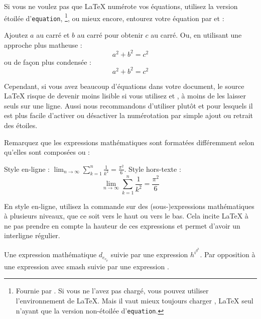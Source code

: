 Si vous ne voulez pas que \LaTeX{} numérote vos équations, utilisez la
version étoilée d'\texttt{equation}, \footnote{Fournie par
  . Si vous ne l'avez pas chargé, vous pouvez utiliser
  l'environnement  de \LaTeX{}. Mais il vaut mieux toujours
  charger , \LaTeX{} seul n'ayant que la version
  non-étoilée d'\texttt{equation}.}, ou mieux encore,
entourez votre équation par \ci{[} et \ci{]} :
\begin{example}
Ajoutez $a$ au carré 
et $b$ au carré pour obtenir
$c$ au carré. Ou, en 
utilisant une approche plus
matheuse :
\begin{equation*}
  a^2 + b^2 = c^2
\end{equation*}
ou de façon plus condensée :
\[ a^2 + b^2 = c^2 \]
\end{example}

Cependant, si vous avez beaucoup d'équations dans votre document, le source
\LaTeX{} risque de devenir moins lisible si vous utilisez \ci{[\iffalse]\fi}
et \ci{\iffalse[\fi]}, à moins de les laisser seuls sur une
ligne. Aussi nous recommandons d'utiliser plutôt  et
 pour lesquels il est plus facile d'activer ou
désactiver la numérotation par simple ajout ou retrait des étoiles.

Remarquez que les expressions mathématiques sont formatées
différemment selon qu'elles sont composées \og {} \fg{} ou \og
{} \fg{} :
 \begin{example}
Style en-ligne :
$\lim_{n \to \infty} 
\sum_{k=1}^n \frac{1}{k^2} 
= \frac{\pi^2}{6}$.
Style hors-texte :
\begin{equation}
  \lim_{n \to \infty} 
  \sum_{k=1}^n \frac{1}{k^2} 
  = \frac{\pi^2}{6}
\end{equation}
\end{example}

En style en-ligne, utilisez la commande  sur des
(sous-)expressions mathématiques à plusieurs niveaux, que ce soit vers
le haut ou vers le bas. Cela incite \LaTeX{} à ne pas prendre en
compte la hauteur de ces expressions et permet d'avoir un interligne
régulier.

\begin{example}
Une expression mathématique
$d_{e_{e_p}}$ suivie par une
expression $h^{i^{g^h}}$. Par
opposition à une expression
avec smash 
suivie par une expression
.
\end{example}


